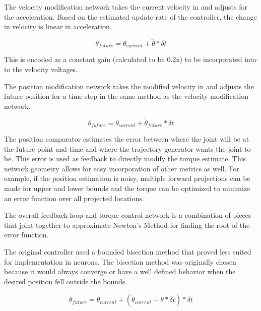 
The velocity modification network takes the current velocity in and adjusts for
the acceleration. Based on the estimated update rate of the controller, the
change in velocity is linear in acceleration.

\begin{equation}
\dot{\theta}_{future} = \dot{\theta}_{current} + \ddot{\theta} * \delta t
\end{equation}

This is encoded as a constant gain (calculated to be 0.2x) to be incorporated 
into to the velocity voltages.


The position modification network takes the modified velocity in and adjusts the
future position for a time step in the same method as the velocity modification
network.

\begin{equation}
\theta_{future} = \theta_{current} + \dot{\theta}_{future} * \delta t
\end{equation}



The position comparator estimates the error between where the joint will be at
the future point and time and where the trajectory generator wants the joint
to be. This error is used as feedback to directly modify the torque estimate.
This network geometry allows for easy incorporation of other metrics as well.
For example, if the position estimation is noisy, multiple forward projections
can be made for upper and lower bounds and the torque can be optimized to 
minimize an error function over all projected locations.


The overall feedback loop and torque control network is a combination of pieces
that joint together to approximate
Newton's Method for finding the root of the error function.

The original 
controller used a bounded bisection method that proved less suited for 
implementation in neurons. The bisection method was originally chosen because
it would always converge or have a well defined behavior when the desired
position fell outside the bounds.

\begin{equation}
\theta_{future} = \theta_{current} + (\dot{\theta}_{current} + \ddot{\theta} * \delta t) * \delta t
\end{equation}

